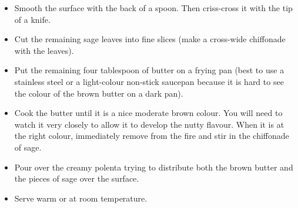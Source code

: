 \documentclass[11pt,letterpaper]{article}
\begin{document}
\begin{description}
\begin{enumerate}
\begin{itemize}
		\item Smooth the surface with the back of a spoon. Then criss-cross it with the tip of a knife.
		\item Cut the remaining sage leaves into fine slices (make a cross-wide chiffonade with the leaves).
		\item Put the remaining four tablespoon of butter on a  frying pan (best to use a stainless steel or a light-colour non-stick saucepan because it is hard to see the colour of the brown butter on a dark pan).
		\item Cook the butter until it is a nice moderate brown colour. You will need to watch it very closely to allow it to develop the nutty flavour. When it is at the right colour, immediately remove from the fire and stir in the chiffonade of sage.
		\item Pour over the creamy polenta trying to distribute both the brown butter and the pieces of sage over the surface.
		\item Serve warm or at room temperature.
	\end{itemize}
     	\end{enumerate}         
\end{description}
\end{document}
